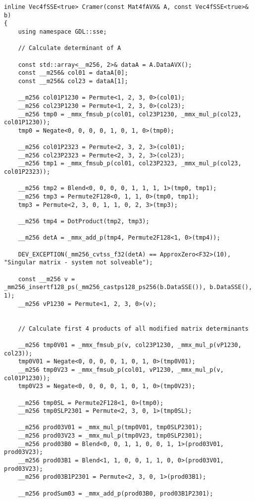 \documentclass[fontsize = 10pt,DIV = 13]{scrartcl}
\begin{document}
\begin{verbatim}
inline Vec4fSSE<true> Cramer(const Mat4fAVX& A, const Vec4fSSE<true>& b)
{
    using namespace GDL::sse;

    // Calculate determinant of A

    const std::array<__m256, 2>& dataA = A.DataAVX();
    const __m256& col01 = dataA[0];
    const __m256& col23 = dataA[1];

    __m256 col01P1230 = Permute<1, 2, 3, 0>(col01);
    __m256 col23P1230 = Permute<1, 2, 3, 0>(col23);
    __m256 tmp0 = _mmx_fmsub_p(col01, col23P1230, _mmx_mul_p(col23, col01P1230));
    tmp0 = Negate<0, 0, 0, 0, 1, 0, 1, 0>(tmp0);

    __m256 col01P2323 = Permute<2, 3, 2, 3>(col01);
    __m256 col23P2323 = Permute<2, 3, 2, 3>(col23);
    __m256 tmp1 = _mmx_fmsub_p(col01, col23P2323, _mmx_mul_p(col23, col01P2323));

    __m256 tmp2 = Blend<0, 0, 0, 0, 1, 1, 1, 1>(tmp0, tmp1);
    __m256 tmp3 = Permute2F128<0, 1, 1, 0>(tmp0, tmp1);
    tmp3 = Permute<2, 3, 0, 1, 1, 0, 2, 3>(tmp3);

    __m256 tmp4 = DotProduct(tmp2, tmp3);

    __m256 detA = _mmx_add_p(tmp4, Permute2F128<1, 0>(tmp4));

    DEV_EXCEPTION(_mm256_cvtss_f32(detA) == ApproxZero<F32>(10), "Singular matrix - system not solveable");

    const __m256 v = _mm256_insertf128_ps(_mm256_castps128_ps256(b.DataSSE()), b.DataSSE(), 1);
    __m256 vP1230 = Permute<1, 2, 3, 0>(v);


    // Calculate first 4 products of all modified matrix determinants

    __m256 tmp0V01 = _mmx_fmsub_p(v, col23P1230, _mmx_mul_p(vP1230, col23));
    tmp0V01 = Negate<0, 0, 0, 0, 1, 0, 1, 0>(tmp0V01);
    __m256 tmp0V23 = _mmx_fmsub_p(col01, vP1230, _mmx_mul_p(v, col01P1230));
    tmp0V23 = Negate<0, 0, 0, 0, 1, 0, 1, 0>(tmp0V23);

    __m256 tmp0SL = Permute2F128<1, 0>(tmp0);
    __m256 tmp0SLP2301 = Permute<2, 3, 0, 1>(tmp0SL);

    __m256 prod03V01 = _mmx_mul_p(tmp0V01, tmp0SLP2301);
    __m256 prod03V23 = _mmx_mul_p(tmp0V23, tmp0SLP2301);
    __m256 prod03B0 = Blend<0, 0, 1, 1, 0, 0, 1, 1>(prod03V01, prod03V23);
    __m256 prod03B1 = Blend<1, 1, 0, 0, 1, 1, 0, 0>(prod03V01, prod03V23);
    __m256 prod03B1P2301 = Permute<2, 3, 0, 1>(prod03B1);

    __m256 prodSum03 = _mmx_add_p(prod03B0, prod03B1P2301);



\end{verbatim}
\end{document}

